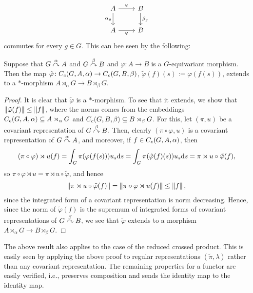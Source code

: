 \begin{equation}
\begin{tikzcd}
	A \arrow[r, "\varphi"] \arrow[d, "\alpha_g"'] & B  \arrow[d, "\beta_g"]\\
	A \arrow[r, "\varphi"'] & B
\end{tikzcd}
\end{equation}
commutes for every $g \in G$. This can bee seen by the following:
\begin{proposition}
Suppose that $G \stackrel{\alpha}{\curvearrowright} A$ and $G \stackrel{\beta}{\curvearrowright} B$ and $\varphi \colon A \to B$ is a $G$-equivariant morphism. Then the map $\tilde \varphi \colon C_c(G,A,\alpha) \to C_c(G,B,\beta)$, $\tilde \varphi (f)(s) := \varphi(f(s))$, extends to a $*$-morphism $A \rtimes_\alpha G \to B \rtimes_\beta G$.
\end{proposition}
\begin{proof}
It is clear that $\tilde \varphi$ is a $*$-morphism. To see that it extends, we show that $\left\lVert \tilde \varphi(f) \right\rVert \leq \left\lVert f \right\rVert$, where the norms comes from the embeddings $C_c(G,A,\alpha) \subseteq A \rtimes_\alpha G$ and $C_c(G,B,\beta) \subseteq B \rtimes_\beta G$. For this, let $(\pi,u)$ be a covariant representation of $G \stackrel{\beta}{\curvearrowright} B$. Then, clearly $(\pi \circ \varphi , u)$ is a covariant representation of $G \stackrel{\alpha}{\curvearrowright} A$, and moreover, if $f \in C_c(G,A,\alpha)$, then
\begin{align*}
	(\pi \circ \varphi) \rtimes u(f) = \int_G \pi(\varphi(f(s))) u_s \mathrm{d} s = \int _G \pi (\tilde \varphi(f)(s)) u_s \mathrm{d} s  =  \pi \rtimes u \circ \tilde \varphi (f),
\end{align*}
so $\pi \circ \varphi \rtimes u = \pi \rtimes u \circ \tilde \varphi$, and hence 
\begin{align*}
	\left\lVert \pi \rtimes u \circ \tilde \varphi(f)\right\rVert = \left\lVert \pi \circ \varphi \rtimes u (f) \right\rVert \leq \left\lVert f \right\rVert,
\end{align*}
since the integrated form of a covariant representation is norm decreasing. Hence, since the norm of $ \tilde \varphi(f)$ is the supremum of integrated forms of covariant representations of $G \stackrel{\beta}{\curvearrowright} B$, we see that $\tilde \varphi$ extends to a morphism $A \rtimes_\alpha G \to B \rtimes_\beta G$.
\end{proof}
The above result also applies to the case of the reduced crossed product. This is easily seen by applying the  above proof to regular representations $(\tilde \pi, \lambda)$ rather than any covariant representation. The remaining properties for a functor are easily verified, i.e., preserves composition and sends the identity map to the identity map.

